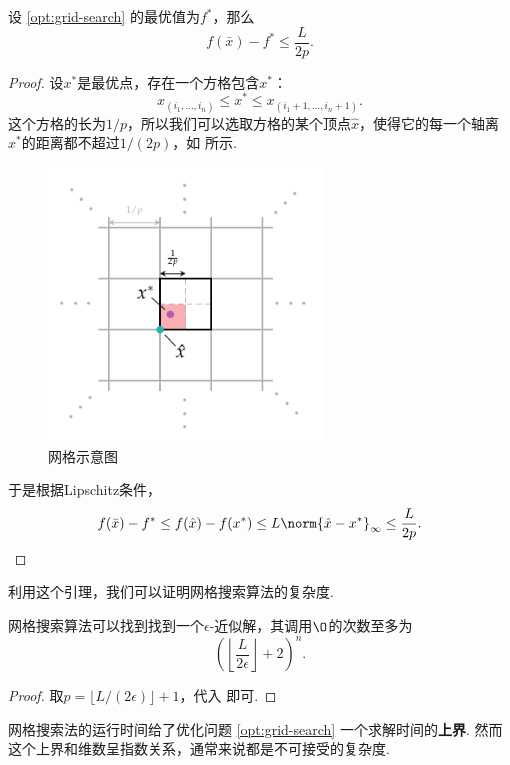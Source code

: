 \begin{lemma}\label{lemma:grid-search}
    设 \eqref{opt:grid-search} 的最优值为$f^*$，那么
\[f(\bar x)-f^*\leq\frac{L}{2p}.\]
\end{lemma}
\begin{proof}
设$x^*$是最优点，存在一个方格包含$x^*$：
\[x_{(i_1,\dots,i_n)}\leq x^*\leq x_{(i_1+1,\dots,i_n+1)}.\]
这个方格的长为$1/p$，所以我们可以选取方格的某个顶点$\hat x$，使得它的每一个轴离$x^*$的距离都不超过$1/(2p)$，如 所示. 

\begin{figure}[H]
    \centering
    \includegraphics[width=0.65\textwidth]{Figures/convex-anlaysis/grid-partition.pdf}
    \caption{网格示意图}
    \label{fig:grid-partition}
\end{figure}

于是根据Lipschitz条件，
    \[f(\bar x)-f^*\leq f(\hat x)-f(x^*)\leq L\norm{\hat x- x^*}_\infty\leq \frac{L}{2p}.\]
\end{proof}

利用这个引理，我们可以证明网格搜索算法的复杂度.
\begin{theorem}
    网格搜索算法可以找到找到一个$\epsilon$-近似解，其调用$\O$的次数至多为
    \[\left(\left\lfloor\frac{L}{2\epsilon}\right\rfloor+2\right)^n.\]
\end{theorem}
\begin{proof}
    取$p=\lfloor L/(2\epsilon)\rfloor+1$，代入 即可.
\end{proof}

网格搜索法的运行时间给了优化问题 \eqref{opt:grid-search} 一个求解时间的\textbf{上界}. 然而这个上界和维数呈指数关系，通常来说都是不可接受的复杂度. 

